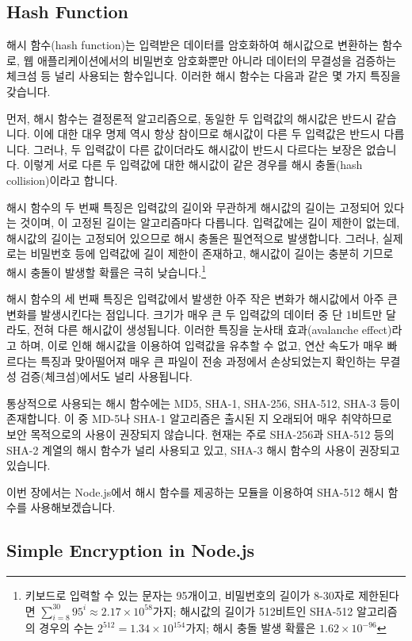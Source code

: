 \subsection*{Hash Function}

해시 함수(hash function)는 입력받은 데이터를 암호화하여 해시값으로 변환하는 함수로, 웹 애플리케이션에서의 비밀번호 암호화뿐만 아니라 데이터의 무결성을 검증하는 체크섬 등 널리 사용되는 함수입니다. 이러한 해시 함수는 다음과 같은 몇 가지 특징을 갖습니다.

먼저, 해시 함수는 결정론적 알고리즘으로, 동일한 두 입력값의 해시값은 반드시 같습니다. 이에 대한 대우 명제 역시 항상 참이므로 해시값이 다른 두 입력값은 반드시 다릅니다. 그러나, 두 입력값이 다른 값이더라도 해시값이 반드시 다르다는 보장은 없습니다. 이렇게 서로 다른 두 입력값에 대한 해시값이 같은 경우를 해시 충돌(hash collision)이라고 합니다.

해시 함수의 두 번째 특징은 입력값의 길이와 무관하게 해시값의 길이는 고정되어 있다는 것이며, 이 고정된 길이는 알고리즘마다 다릅니다. 입력값에는 길이 제한이 없는데, 해시값의 길이는 고정되어 있으므로 해시 충돌은 필연적으로 발생합니다. 그러나, 실제로는 비밀번호 등에 입력값에 길이 제한이 존재하고, 해시값이 길이는 충분히 기므로 해시 충돌이 발생할 확률은 극히 낮습니다.\footnote{키보드로 입력할 수 있는 문자는 95개이고, 비밀번호의 길이가 8-30자로 제한된다면 $\sum_{i=8}^{30}95^i\approx 2.17\times 10^{58}$가지; 해시값의 길이가 512비트인 SHA-512 알고리즘의 경우의 수는 $2^{512}=1.34\times 10^{154}$가지; 해시 충돌 발생 확률은 $1.62\times 10^{-96}$}

해시 함수의 세 번째 특징은 입력값에서 발생한 아주 작은 변화가 해시값에서 아주 큰 변화를 발생시킨다는 점입니다. 크기가 매우 큰 두 입력값의 데이터 중 단 1비트만 달라도, 전혀 다른 해시값이 생성됩니다. 이러한 특징을 눈사태 효과(avalanche effect)라고 하며, 이로 인해 해시값을 이용하여 입력값을 유추할 수 없고, 연산 속도가 매우 빠르다는 특징과 맞아떨어져 매우 큰 파일이 전송 과정에서 손상되었는지 확인하는 무결성 검증(체크섬)에서도 널리 사용됩니다.

통상적으로 사용되는 해시 함수에는 MD5, SHA-1, SHA-256, SHA-512, SHA-3 등이 존재합니다. 이 중 MD-5나 SHA-1 알고리즘은 출시된 지 오래되어 매우 취약하므로 보안 목적으로의 사용이 권장되지 않습니다. 현재는 주로 SHA-256과 SHA-512 등의 SHA-2 계열의 해시 함수가 널리 사용되고 있고, SHA-3 해시 함수의 사용이 권장되고 있습니다.

이번 장에서는 Node.js에서 해시 함수를 제공하는 모듈을 이용하여 SHA-512 해시 함수를 사용해보겠습니다.

\subsection*{Simple Encryption in Node.js}

